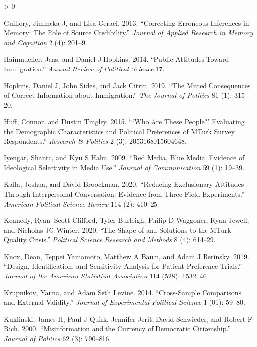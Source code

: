 \documentclass[
  12pt,
]{article}
\newlength{\cslhangindent}
\newenvironment{CSLReferences}[2] %
 {%
  \setlength{\parindent}{0pt}
  \ifodd #1 \everypar{\setlength{\hangindent}{\cslhangindent}}\ignorespaces\fi
  \ifnum #2 > 0
  \setlength{\parskip}{#2\baselineskip}
  \fi
 }%
 {}
\begin{document}
\begin{CSLReferences}{1}{0}
\leavevmode\hypertarget{ref-guillory2013correcting}{}%
Guillory, Jimmeka J, and Lisa Geraci. 2013. {``Correcting Erroneous
Inferences in Memory: The Role of Source Credibility.''} \emph{Journal
of Applied Research in Memory and Cognition} 2 (4): 201--9.

\leavevmode\hypertarget{ref-hainmueller2014public}{}%
Hainmueller, Jens, and Daniel J Hopkins. 2014. {``Public Attitudes
Toward Immigration.''} \emph{Annual Review of Political Science} 17.

\leavevmode\hypertarget{ref-hopkins2019muted}{}%
Hopkins, Daniel J, John Sides, and Jack Citrin. 2019. {``The Muted
Consequences of Correct Information about Immigration.''} \emph{The
Journal of Politics} 81 (1): 315--20.

\leavevmode\hypertarget{ref-huff2015these}{}%
Huff, Connor, and Dustin Tingley. 2015. {``{`Who Are These People?'}
Evaluating the Demographic Characteristics and Political Preferences of
MTurk Survey Respondents.''} \emph{Research \& Politics} 2 (3):
2053168015604648.

\leavevmode\hypertarget{ref-iyengar2009red}{}%
Iyengar, Shanto, and Kyu S Hahn. 2009. {``Red Media, Blue Media:
Evidence of Ideological Selectivity in Media Use.''} \emph{Journal of
Communication} 59 (1): 19--39.

\leavevmode\hypertarget{ref-kalla2020reducing}{}%
Kalla, Joshua, and David Broockman. 2020. {``Reducing Exclusionary
Attitudes Through Interpersonal Conversation: Evidence from Three Field
Experiments.''} \emph{American Political Science Review} 114 (2):
410--25.

\leavevmode\hypertarget{ref-kennedy2020shape}{}%
Kennedy, Ryan, Scott Clifford, Tyler Burleigh, Philip D Waggoner, Ryan
Jewell, and Nicholas JG Winter. 2020. {``The Shape of and Solutions to
the MTurk Quality Crisis.''} \emph{Political Science Research and
Methods} 8 (4): 614--29.

\leavevmode\hypertarget{ref-knox2019design}{}%
Knox, Dean, Teppei Yamamoto, Matthew A Baum, and Adam J Berinsky. 2019.
{``Design, Identification, and Sensitivity Analysis for Patient
Preference Trials.''} \emph{Journal of the American Statistical
Association} 114 (528): 1532--46.

\leavevmode\hypertarget{ref-krupnikov2014cross}{}%
Krupnikov, Yanna, and Adam Seth Levine. 2014. {``Cross-Sample
Comparisons and External Validity.''} \emph{Journal of Experimental
Political Science} 1 (01): 59--80.

\leavevmode\hypertarget{ref-kuklinski2000misinformation}{}%
Kuklinski, James H, Paul J Quirk, Jennifer Jerit, David Schwieder, and
Robert F Rich. 2000. {``Misinformation and the Currency of Democratic
Citizenship.''} \emph{Journal of Politics} 62 (3): 790--816.


\end{CSLReferences}
\end{document}
